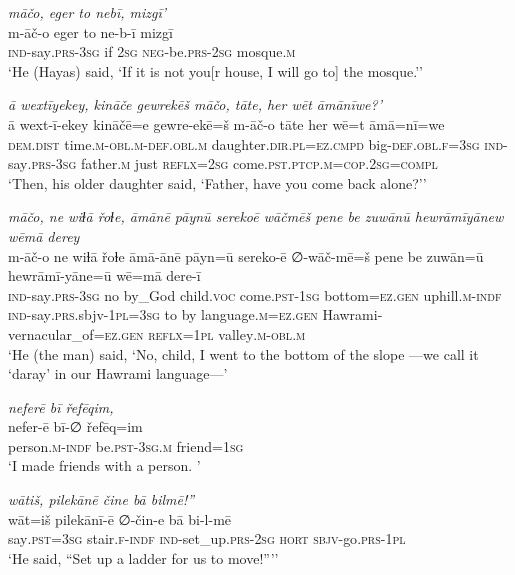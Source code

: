 \ea \label{ŽH.18}
\textit{māčo, eger to nebī, mizgī’} \\ 
\gll m-āč-o eger to ne-b-ī mizgī \\ 
 \textsc{ind-}say\textsc{.prs}\textsc{-3sg} if \textsc{2sg} \textsc{neg-}be\textsc{.prs}-\textsc{2sg} mosque\textsc{.m} \\ 
\glt `He (Hayas) said, ‘If it is not you[r house, I will go to] the mosque.’'
\z 
 
\ea \label{ŽH.22}
\textit{ā wextīyekey, kināče gewrekēš māčo, tāte, her wēt āmānīwe?’} \\ 
\gll ā wext-ī-ekey kināčē=e gewre-ekē=š m-āč-o tāte her wē=t āmā=nī=we \\ 
 \textsc{dem.dist} time\textsc{.m}\textsc{-obl}\textsc{.m}\textsc{-def}\textsc{.obl}\textsc{.m} daughter\textsc{.dir}\textsc{.pl}\textsc{=ez}\textsc{.cmpd} big\textsc{-def}\textsc{.obl}\textsc{\textsc{.f}}\textsc{=3sg} \textsc{ind-}say\textsc{.prs}\textsc{-3sg} father\textsc{.m} just \textsc{reflx}\textsc{=\textsc{2sg}} come\textsc{.pst}\textsc{.ptcp}\textsc{.m}\textsc{=cop}\textsc{.\textsc{2sg}}\textsc{=compl} \\ 
\glt `Then, his older daughter said, ‘Father, have you come back alone?’'
\z 
 
\ea \label{ŽH.23}
\textit{māčo, ne wiɫā řoɫe, āmānē pāynū serekoē wāčmēš pene be zuwānū hewrāmīyānew wēmā derey} \\ 
\gll m-āč-o ne wiɫā řoɫe āmā-ānē pāyn=ū sereko-ē ∅-wāč-mē=š pene be zuwān=ū hewrāmī-yāne=ū wē=mā dere-ī \\ 
 \textsc{ind-}say\textsc{.prs}\textsc{-3sg} no by\_God child.\textsc{voc} come\textsc{.pst}\textsc{-1sg} bottom\textsc{=ez}\textsc{.gen} uphill\textsc{.m}\textsc{-indf} \textsc{ind-}say\textsc{.prs}.sbjv\textsc{-1pl}\textsc{=3sg} to by language\textsc{.m}\textsc{=ez}\textsc{.gen} Hawrami-vernacular\_of\textsc{=ez}\textsc{.gen} \textsc{reflx}\textsc{=1pl} valley\textsc{.m}\textsc{-obl}\textsc{.m} \\ 
\glt `He (the man) said, ‘No, child, I went to the bottom of the slope —we call it ‘daray’ in our Hawrami language—'
\z 
 
\ea \label{ŽH.24}
\textit{neferē bī řefēqim,} \\ 
\gll nefer-ē bī-∅ řefēq=im \\ 
 person\textsc{.m}\textsc{-indf} be\textsc{.pst}\textsc{-3sg}\textsc{.m} friend\textsc{=1sg} \\ 
\glt `I made friends with a person. '
\z 
 
\ea \label{ŽH.25}
\textit{wātiš, pilekānē čine bā bilmē!”} \\ 
\gll wāt=iš pilekānī-ē ∅-čin-e bā bi-l-mē \\ 
 say\textsc{.pst}\textsc{=3sg} stair\textsc{\textsc{.f}}\textsc{-indf} \textsc{ind-}set\_up\textsc{.prs}-\textsc{2sg} \textsc{hort} \textsc{sbjv-}go\textsc{.prs}\textsc{-1pl} \\ 
\glt `He said, “Set up a ladder for us to move!”’'
\z 
 
